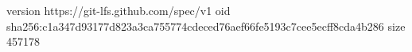 version https://git-lfs.github.com/spec/v1
oid sha256:c1a347d93177d823a3ca755774cdeced76aef66fe5193c7cee5ecff8cda4b286
size 457178
